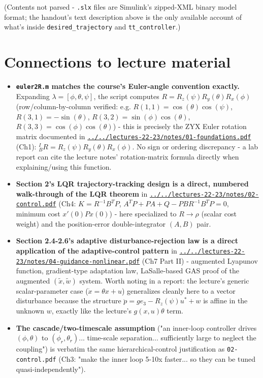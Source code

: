 \documentclass[11pt]{article}
\begin{document}
(Contents not parsed - \texttt{.slx} files are Simulink's zipped-XML binary model format; the handout's text description above is the only available account of what's inside \texttt{desired\_\allowbreak{}trajectory} and \texttt{tt\_\allowbreak{}controller}.)

\section{Connections to lecture material}

\begin{itemize}
\item \textbf{\texttt{euler2R.m} matches the course's Euler-angle convention exactly.} Expanding $\lambda=[\phi,\theta,\psi]$, the script computes $R = R_z(\psi)R_y(\theta)R_x(\phi)$ (row/column-by-column verified: e.g. $R(1,1)=\cos(\theta)\cos(\psi)$, $R(3,1)=-\sin(\theta)$, $R(3,2)=\sin(\phi)\cos(\theta)$, $R(3,3)=\cos(\phi)\cos(\theta)$) - this is precisely the ZYX Euler rotation matrix documented in \href{../../lectures-22-23/notes/01-foundations.pdf}{\texttt{../../lectures-22-23/notes/01-\allowbreak{}foundations.pdf}} (Ch1): ${}^I_BR = R_z(\psi)R_y(\theta)R_x(\phi)$. No sign or ordering discrepancy - a lab report can cite the lecture notes' rotation-matrix formula directly when explaining/using this function.
\item \textbf{Section 2's LQR trajectory-tracking design is a direct, numbered walk-through of the LQR theorem} in \href{../../lectures-22-23/notes/02-control.pdf}{\texttt{../../lectures-22-23/notes/02-\allowbreak{}control.pdf}} (Ch4: $K=R^{-1}B^TP$, $A^TP+PA+Q-PBR^{-1}B^TP=0$, minimum cost $x'(0)Px(0)$) - here specialized to $R\to\rho$ (scalar cost weight) and the position-error double-integrator $(A,B)$ pair.
\item \textbf{Section 2.4-2.6's adaptive disturbance-rejection law is a direct application of the adaptive-control pattern} in \href{../../lectures-22-23/notes/04-guidance-nonlinear.pdf}{\texttt{../../lectures-22-23/notes/04-\allowbreak{}guidance-\allowbreak{}nonlinear.pdf}} (Ch7 Part II) - augmented Lyapunov function, gradient-type adaptation law, LaSalle-based GAS proof of the augmented $(\tilde x,\tilde w)$ system. Worth noting in a report: the lecture's generic scalar-parameter case ($\dot x=\theta x+u$) generalizes cleanly here to a vector disturbance because the structure $\ddot p = ge_3-R_z(\psi)u^*+w$ is affine in the unknown $w$, exactly like the lecture's $g(x,u)\theta$ term.
\item \textbf{The cascade/two-timescale assumption} ("an inner-loop controller drives $(\phi,\theta)$ to $(\phi_r,\theta_r)$... time-scale separation... sufficiently large to neglect the coupling") is verbatim the same hierarchical-control justification as \texttt{02-\allowbreak{}control.pdf} (Ch3: "make the inner loop 5-10x faster... so they can be tuned quasi-independently").

\end{itemize}
\end{document}

